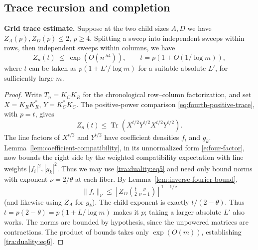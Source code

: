 \subsection{Trace recursion and completion}
\begin{proposition}\label{tra:duality:recursion}
\label{tra:duality:trace-recursion-statement}
\textbf{Grid trace estimate.} Suppose at the two child sizes \(A,D\) we have \(Z_{A}(p), Z_{D}(p)\le 2\), \(p\ge 4\). Splitting a sweep into independent sweeps within rows, then independent sweeps within columns, we have
\begin{equation}
        Z_n(t)\ \le\ \exp(O(n^{.54})),\qquad
                  t=p(1+O(1/\log m)),                             \label{tra:duality:eq6}
\end{equation}
where \(t\) can be taken as \(p(1+L'/\log m)\) for a suitable absolute \(L'\), for sufficiently large \(m\).
\end{proposition}
\begin{proof}\label{tra:duality:recursion-proof}
\label{tra:duality:hausdorff-young-recursion}
Write $T_n=K_CK_R$ for the chronological row--column factorization,
and set $X=K_RK_R^*$, $Y=K_C^*K_C$. The positive-power comparison
\eqref{eq:fourth-positive-trace}, with $p=t$, gives
\[
 Z_n(t)\le\operatorname{Tr}(X^{t/2}Y^{t/2}X^{t/2}Y^{t/2}).
\]
The line factors of $X^{t/2}$ and $Y^{t/2}$ have coefficient
densities $f_i$ and $g_k$. Lemma~\ref{lem:coefficient-compatibility},
in its unnormalized form \eqref{e:four-factor}, now bounds the right
side by the weighted compatibility expectation with line weights
$|f_i|^2,|g_k|^2$.
Thus we may use \eqref{tra:duality:eq5} and need only bound norms with exponent \(\nu=2/\theta\) at each fiber. By Lemma~\ref{lem:inverse-fourier-bound},
\[
 \|f_i\|_\nu
 \le \left[ Z_D\left(\tfrac{t}{2}\,\tfrac{\nu}{\nu-1}\right)
                                      \right]^{1-1/\nu}
\]
(and likewise using \(Z_A\) for \(g_k\)). The child exponent is exactly $t/(2-\theta)$. Thus $t=p(2-\theta)=p(1+L/\log m)$ makes it $p$; taking a larger absolute $L'$ also works. The norms are bounded by hypothesis, since the unpowered matrices are contractions. The product of bounds takes only \(\exp(O(m))\), establishing \eqref{tra:duality:eq6}.
\end{proof}
